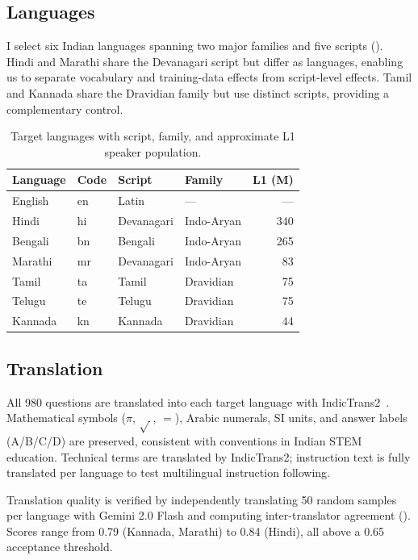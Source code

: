 \documentclass[11pt,a4paper]{article}
\begin{document}
\subsection{Languages}

I select six Indian languages spanning two major families and five scripts ().
Hindi and Marathi share the Devanagari script but differ as languages, enabling us to separate vocabulary and training-data effects from script-level effects.
Tamil and Kannada share the Dravidian family but use distinct scripts, providing a complementary control.

\begin{table}[t]
\centering
\small
\caption{Target languages with script, family, and approximate L1 speaker population.}
\label{tab:languages}
\begin{tabular}{@{}llllr@{}}
\toprule
\textbf{Language} & \textbf{Code} & \textbf{Script} & \textbf{Family} & \textbf{L1 (M)} \\
\midrule
English & en & Latin & --- & --- \\
Hindi & hi & Devanagari & Indo-Aryan & 340 \\
Bengali & bn & Bengali & Indo-Aryan & 265 \\
Marathi & mr & Devanagari & Indo-Aryan & 83 \\
Tamil & ta & Tamil & Dravidian & 75 \\
Telugu & te & Telugu & Dravidian & 75 \\
Kannada & kn & Kannada & Dravidian & 44 \\
\bottomrule
\end{tabular}
\end{table}

\subsection{Translation}

All 980 questions are translated into each target language with IndicTrans2~\citep{gala2023indictrans2}.
Mathematical symbols ($\pi$, $\sqrt{\,}$, $=$), Arabic numerals, SI units, and answer labels (A/B/C/D) are preserved, consistent with conventions in Indian STEM education.
Technical terms are translated by IndicTrans2; instruction text is fully translated per language to test multilingual instruction following.

Translation quality is verified by independently translating 50 random samples per language with Gemini 2.0 Flash and computing inter-translator agreement ().
Scores range from 0.79 (Kannada, Marathi) to 0.84 (Hindi), all above a 0.65 acceptance threshold.
\end{document}
